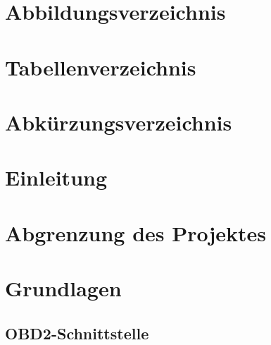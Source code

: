\documentclass[4paper,10pt]{article}
\begin{document}
\tableofcontents
\newpage

\section{Abbildungsverzeichnis}
\listoffigures
\newpage

\section{Tabellenverzeichnis}
\listoftables
\newpage

\section{Abkürzungsverzeichnis}
\newpage





\setcounter{section}{0} 
\renewcommand{\thesection}{\arabic{section}}


\section{Einleitung}
\newpage

\section{Abgrenzung des Projektes}
\newpage

\section{Grundlagen}
\subsection{OBD2-Schnittstelle}
\end{document}
